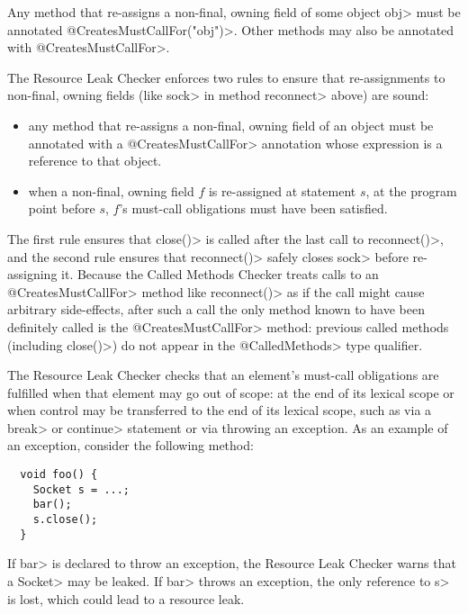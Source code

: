 
Any method that re-assigns a non-final, owning field of some object \<obj>
must be annotated \<@CreatesMustCallFor("obj")>.
Other methods may also be annotated with \<@CreatesMustCallFor>.

The Resource Leak Checker enforces two rules to ensure that re-assignments
to non-final, owning fields (like \<sock> in method \<reconnect> above) are
sound:
\begin{itemize}
\item any method that re-assigns a non-final, owning field of an object
  must be annotated with a \<@CreatesMustCallFor> annotation
  whose expression is a reference to that object.
\item when a non-final, owning field $f$ is re-assigned at statement $s$,
  at the program point before $s$, $f$'s must-call obligations must have been satisfied.
\end{itemize}
\noindent
The first rule ensures that \<close()> is called after the last call
to \<reconnect()>, and the second rule ensures that \<reconnect()>
safely closes \<sock> before re-assigning it. Because the Called Methods Checker
treats calls to an \<@CreatesMustCallFor> method like \<reconnect()> as if the call might
cause arbitrary side-effects, after such a call the only method known to have been
definitely called is the \<@CreatesMustCallFor> method: previous called
methods (including \<close()>) do not appear in the \<@CalledMethods> type qualifier.




The Resource Leak Checker checks that an element's must-call obligations
are fulfilled when that element may go out of scope: at the end of its
lexical scope or when control may be transferred to the end of its lexical
scope, such as via a \<break> or \<continue> statement or via throwing an
exception.  As an example of an exception, consider the following method:

\begin{verbatim}
  void foo() {
    Socket s = ...;
    bar();
    s.close();
  }
\end{verbatim}

If \<bar> is declared to throw an exception, the Resource Leak Checker
warns that a \<Socket> may be leaked.  If \<bar> throws an exception, the
only reference to \<s> is lost, which could lead to a resource leak.

